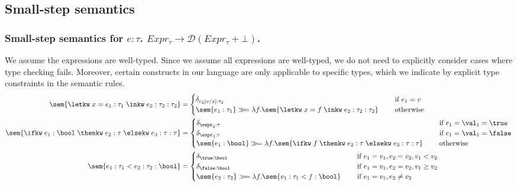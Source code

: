 \subsection{Small-step semantics}

\subsubsection{Small-step semantics for $e : \tau$. $Expr_{\tau} \to \mathcal{D}(Expr_{\tau} + \bot)$.}
We assume the expressions are well-typed. Since we assume all expressions are well-typed, we do not need to explicitly consider cases where type checking fails. Moreover, certain constructs in our language are only applicable to specific types, which we indicate by explicit type constraints in the semantic rules.
{
\footnotesize
\allowdisplaybreaks
\begin{align*}
	\sem{ \letkw \; x = e_1 : \tau_1 \; \inkw \; e_2 : \tau_2 : \tau_2} &= \begin{cases}
		\delta_{e_2[v/x] : \tau_2} \quad &\text{ if } e_1 = v \\
		\sem{ e_1 : \tau_1 } \gg\!= \lambda f. \sem{ \letkw \; x = f \; \inkw \; e_2 : \tau_2 : \tau_2} \quad &\text{ otherwise } \\
	\end{cases} \\
	\sem{ \ifkw \; e_1 : \bool \; \thenkw \; e_2 : \tau \; \elsekw \; e_3 : \tau : \tau} &= \begin{cases}
		\delta_{\expr_2 : \tau}  \quad &\text{ if $e_1 = \val_1 = \true$} \\
		\delta_{\expr_3 : \tau}  \quad &\text{ if $e_1 = \val_1 = \false$} \\
		\sem{ e_1 : \bool} \gg\!= \lambda f. \sem{ \ifkw \; f \; \thenkw \; e_2 : \tau \; \elsekw \; e_3 : \tau : \tau} \quad &\text{ otherwise } \\
	\end{cases} \\
	\sem{ e_1 : \tau_1 < e_2 : \tau_2 : \bool} &= \begin{cases}
		\delta_{\true : \bool} \quad &\text{ if } e_1 = v_1, e_2 = v_2, v_1 < v_2 \\
		\delta_{\false : \bool} \quad &\text{ if } e_1 = v_1, e_2 = v_2, v_1 \geq v_2 \\
		\sem{ e_2 : \tau_2 } \gg\!= \lambda f. \sem{ v_1 : \tau_1 < f : \bool} \quad &\text{ if } e_1 = v_1, e_2 \neq v_2 \\

\end{cases}
\end{align*}}
